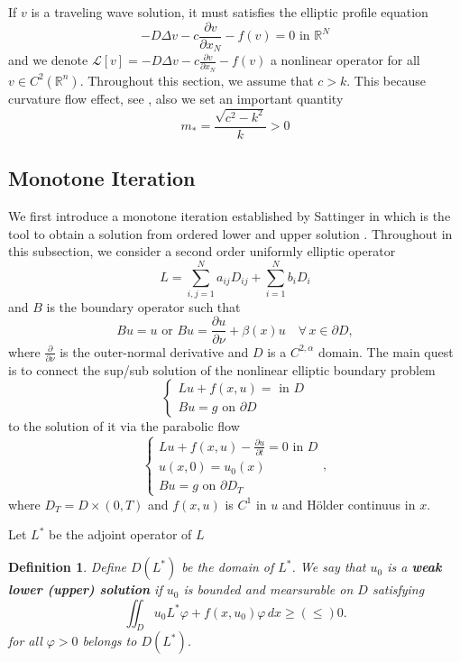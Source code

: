 \documentclass[12pt, a4paper]{article}
\newtheorem{defn}[thm]{Definition}
\numberwithin{equation}{section}
\renewcommand{\L}{\mathcal{L}}
\newcommand{\R}{\mathbb{R}}
\newcommand{\named}[1]{\textnormal{\textbf{#1}}}
\newcommand{\pd}[2]{\frac{\partial #1}{\partial #2}}
\begin{document}
\begin{CJK}{UTF8}{bkai}
If $v$ is a traveling wave solution, it must satisfies the elliptic profile equation
\begin{equation}\label{iden2.4}
	-D\Delta v-c\pd{v}{x_N}-f(v)=0\mbox{ in }\R^N
\end{equation}
and we denote $\L[v]=-D\Delta v-c\pd{v}{x_N}-f(v)$ a nonlinear operator for all $v\in C^2(\R^n)$. Throughout this section, we assume that $c>k$. This because curvature flow effect, see \cite{NT2006}, also we set an important quantity
\begin{equation}
	m_*=\frac{\sqrt{c^2-k^2}}{k}>0
\end{equation}




\subsection{Monotone Iteration}

	We first introduce a monotone iteration established by Sattinger in \cite{Sa1972} which is the tool to obtain a solution from ordered lower and upper solution . Throughout in this subsection, we consider a second order uniformly elliptic operator
\[
	L=\sum_{i,j=1}^Na_{ij}D_{ij}+\sum_{i=1}^N b_iD_{i}
\]
and $B$ is the boundary operator such that
\[
	Bu=u\mbox{ or }Bu=\pd{u}{\nu}+\beta(x)u\quad\forall\,x\in\partial D,
\]
where $\pd{}{\nu}$ is the outer-normal derivative and $D$ is a $C^{2,\alpha}$ domain. The main quest is to connect the sup/sub solution of the nonlinear elliptic boundary problem
\begin{equation}\label{iden2.6}
\begin{cases}
	Lu+f(x,u)=\mbox{ in }D\\
	Bu=g\mbox{ on }\partial D
\end{cases}
\end{equation} 
to the solution of it via the parabolic flow
\begin{equation}\label{iden2.7}
\begin{cases}
	Lu+f(x,u)-\pd{u}{t}=0\mbox{ in }D\\
	u(x,0)=u_0(x)\\
	Bu=g\mbox{ on }\partial D_T
\end{cases},
\end{equation}
where $D_T=D\times(0,T)$ and $f(x,u)$ is $C^1$ in $u$ and H\"older continuus in $x$.

	Let $L^*$ be the adjoint operator of $L$
\begin{defn}
	Define $D(L^*)$ be the domain of $L^*$. We say that $u_0$ is a \named{weak lower (upper) solution} if $u_0$ is bounded and mearsurable on $D$ satisfying
\begin{equation}
	\iint_{D}u_0L^*\varphi+f(x,u_0)\varphi\,dx\geq(\leq) 0.
\end{equation}
for all $\varphi>0$ belongs to $D(L^*)$. 
\end{defn}


\end{CJK}
\end{document}
